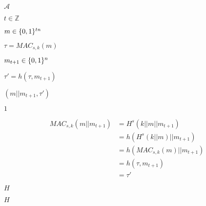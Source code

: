 \documentclass[10pt]{book}
\begin{document}
\begin{mdSnippets}
\begin{mdInlineSnippet}[ad70146b431bea9ae74cf8385470c544]
$\mathcal{A}$\end{mdInlineSnippet}%
\begin{mdInlineSnippet}[9cb6a478cc4b71ed499917558a216ab4]%
$t \in \mathbb{Z}$\end{mdInlineSnippet}%
\begin{mdInlineSnippet}[8fdf8c003374a22322be8aa144ac7bd1]%
$m \in \{0,1\}^{tn}$\end{mdInlineSnippet}%
\begin{mdInlineSnippet}[2f0281945488ed06634be6dc6ecf5aa5]%
$\tau = MAC_{s,k}(m)$\end{mdInlineSnippet}%
\begin{mdInlineSnippet}%
$m_{t+1} \in \{0,1\}^n$\end{mdInlineSnippet}%
\begin{mdInlineSnippet}[ae73b595582bb83936fe8314d6a9b591]%
$\tau' = h(\tau, m_{t+1})$\end{mdInlineSnippet}%
\begin{mdInlineSnippet}[ee95830ca24da10b2066241795177da4]%
$(m || m_{t+1}, \tau')$\end{mdInlineSnippet}%
\begin{mdInlineSnippet}[c4ca4238a0b923820dcc509a6f75849b]%
$1$\end{mdInlineSnippet}%
\begin{mdDisplaySnippet}%
\[%
\begin{aligned}
MAC_{s,k}(m || m_{t+1}) &= H^s(k || m || m_{t+1}) \\
&= h(H^s(k || m) || m_{t+1}) \\
&= h(MAC_{s,k}(m) || m_{t+1}) \\
&= h(\tau, m_{t+1}) \\
&= \tau'
\end{aligned} 
\]%
\end{mdDisplaySnippet}%
\begin{mdInlineSnippet}[c1d9f50f86825a1a2302ec2449c17196]%
$H$\end{mdInlineSnippet}%
\begin{mdInlineSnippet}[c1d9f50f86825a1a2302ec2449c17196]%
$H$\end{mdInlineSnippet}%
\begin{mdInlineSnippet}[ad70146b431bea9ae74cf8385470c544]%

\end{mdInlineSnippet}
\end{mdSnippets}
\end{document}
